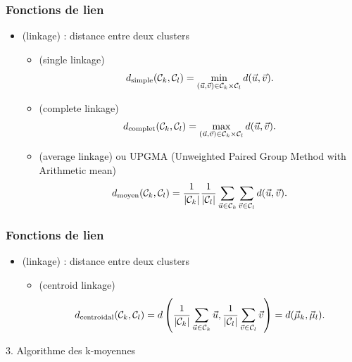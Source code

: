 \begin{frame}
  \frametitle{Fonctions de lien}
  \begin{itemize}
  \item {} \textcolor{gray!70}{(linkage)} : distance entre deux clusters
    \begin{itemize}
    \item {} \textcolor{gray!70}{(single linkage)}
      \[ d_{\text{simple}}(\mathcal{C}_k, \mathcal{C}_l) = \min_{(\vec{u}, \vec{v}) \in \mathcal{C}_k \times \mathcal{C}_l } d(\vec{u}, \vec{v}).
      \]
      \pause
    \item {} \textcolor{gray!70}{(complete linkage)}
      \[
        d_{\text{complet}}(\mathcal{C}_k, \mathcal{C}_l) = \max_{(\vec{u}, \vec{v}) \in \mathcal{C}_k \times \mathcal{C}_l} d(\vec{u}, \vec{v}).
      \]
      \pause
    \item {} \textcolor{gray!70}{(average linkage)} ou UPGMA \textcolor{gray!70}{(Unweighted Paired Group Method with Arithmetic mean)}
      \[
        d_{\text{moyen}}(\mathcal{C}_k, \mathcal{C}_l) = \frac1{\lvert \mathcal{C}_k \rvert} 
        \frac1{\lvert \mathcal{C}_l \rvert}
        \sum_{\vec{u} \in \mathcal{C}_k}\sum_{\vec{v} \in \mathcal{C}_l} d(\vec{u}, \vec{v}).
      \]
    \end{itemize}
  \end{itemize}
\end{frame}

\begin{frame}[t]
  \frametitle{Fonctions de lien}
  \begin{itemize}
  \item {} \textcolor{gray!70}{(linkage)} : distance entre deux clusters
    \begin{itemize}
    \item {} \textcolor{gray!70}{(centroid linkage)}
      \[
        d_{\text{centroidal}}(\mathcal{C}_k, \mathcal{C}_l) = d \left (\frac1{\lvert \mathcal{C}_k \rvert} 
          \sum_{\vec{u} \in \mathcal{C}_k} \vec{u}, 
          \frac1{\lvert \mathcal{C}_l \rvert} \sum_{\vec{v} \in \mathcal{C}_l} \vec{v} \right) = 
        d(\vec{\mu}_k, \vec{\mu}_l).
      \]
    \end{itemize}
  \end{itemize}
\end{frame}










\begin{frame}
  \begin{center}
    \large{3. Algorithme des k-moyennes}
  \end{center}
\end{frame}

